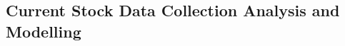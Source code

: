 \documentclass[conference]{IEEEtran}
\begin{document}

\subsection{Current Stock Data Collection Analysis and Modelling}
        	




\end{document}
